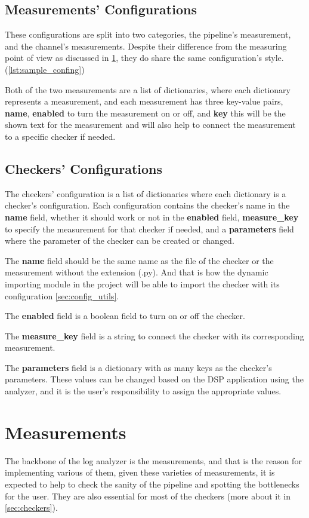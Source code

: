 \subsection{Measurements' Configurations}
These configurations are split into two categories, the pipeline's measurement, and
the channel's measurements. Despite their difference from the measuring point of view
as discussed in \ref{sec:measures}, they do share the same configuration's style. (\ref{lst:sample_confing})

Both of the two measurements are a list of dictionaries, where each dictionary
represents a measurement, and each measurement has three key-value pairs,
\textbf{name}, \textbf{enabled}
to turn the measurement on or off, and \textbf{key} this will be the shown
text for the measurement and will also help to connect the measurement to 
a specific checker if needed.

\subsection{Checkers' Configurations}
The checkers' configuration is a
list of dictionaries where each dictionary is a checker's configuration. Each configuration
contains the checker's name in the \textbf{name} field, whether it should work or not in
the \textbf{enabled} field, \textbf{measure\_key} to specify the measurement
for that checker if needed, and a \textbf{parameters} field where the parameter
of the checker can be created or changed.

The \textbf{name} field should be the same name as the file of the checker or the measurement
without the extension (.py). And that is how the dynamic importing module in 
the project will be able to import the checker with its configuration \ref{sec:config_utils}.

The \textbf{enabled} field is a boolean field to turn on or off the checker.

The \textbf{measure\_key} field is a string to connect the checker with
its corresponding measurement.

The \textbf{parameters} field is a dictionary with as many keys as the checker's
parameters. These values can be changed based on the DSP application using the
analyzer, and it is the user's responsibility to assign the appropriate values.

\section{Measurements} \label{sec:measures}
The backbone of the log analyzer is the measurements, and that is the reason for implementing
various of them, given these varieties of measurements, it is expected to
help to check the sanity of the pipeline and spotting the bottlenecks for the user. They
are also essential for most of the checkers (more about it in \ref{sec:checkers}).


